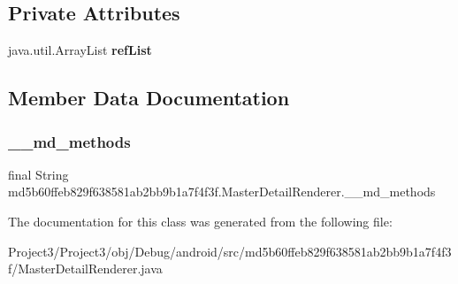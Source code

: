 \subsection*{Private Attributes}
\begin{DoxyCompactItemize}
\item 
\mbox{\label{classmd5b60ffeb829f638581ab2bb9b1a7f4f3f_1_1MasterDetailRenderer_a30c285665b3a72e9c0975bf43b4f8210}} 
java.\+util.\+Array\+List {\bfseries ref\+List}
\end{DoxyCompactItemize}


\subsection{Member Data Documentation}
\mbox{\label{classmd5b60ffeb829f638581ab2bb9b1a7f4f3f_1_1MasterDetailRenderer_ace7bfaacfb9e54f304255e32cc2b83de}} 
\subsubsection{\texorpdfstring{\+\_\+\+\_\+md\+\_\+methods}{\_\_md\_methods}}
{\footnotesize\ttfamily final String md5b60ffeb829f638581ab2bb9b1a7f4f3f.\+Master\+Detail\+Renderer.\+\_\+\+\_\+md\+\_\+methods\hspace{0.3cm}{\ttfamily [static]}}



The documentation for this class was generated from the following file\+:\begin{DoxyCompactItemize}
\item 
Project3/\+Project3/obj/\+Debug/android/src/md5b60ffeb829f638581ab2bb9b1a7f4f3f/Master\+Detail\+Renderer.\+java\end{DoxyCompactItemize}
